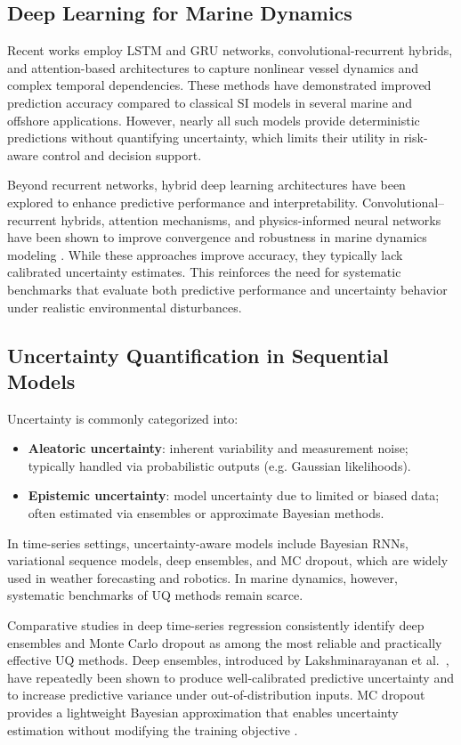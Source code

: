 \documentclass[a4paper,fleqn]{cas-sc}
\begin{document}
\subsection{Deep Learning for Marine Dynamics}

Recent works employ LSTM and GRU networks, convolutional-recurrent hybrids, and attention-based architectures to capture nonlinear vessel dynamics and complex temporal dependencies. These methods have demonstrated improved prediction accuracy compared to classical SI models in several marine and offshore applications. However, nearly all such models provide deterministic predictions without quantifying uncertainty, which limits their utility in risk-aware control and decision support.

Beyond recurrent networks, hybrid deep learning architectures have been explored to enhance predictive performance and interpretability. Convolutional--recurrent hybrids, attention mechanisms, and physics-informed neural networks have been shown to improve convergence and robustness in marine dynamics modeling \cite{gong2025wavelet,baier2021hybrid}. While these approaches improve accuracy, they typically lack calibrated uncertainty estimates. This reinforces the need for systematic benchmarks that evaluate both predictive performance and uncertainty behavior under realistic environmental disturbances.


\subsection{Uncertainty Quantification in Sequential Models}

Uncertainty is commonly categorized into:
\begin{itemize}
    \item \textbf{Aleatoric uncertainty}: inherent variability and measurement noise; typically handled via probabilistic outputs (e.g. Gaussian likelihoods).
    \item \textbf{Epistemic uncertainty}: model uncertainty due to limited or biased data; often estimated via ensembles or approximate Bayesian methods.
\end{itemize}

In time-series settings, uncertainty-aware models include Bayesian RNNs, variational sequence models, deep ensembles, and MC dropout, which are widely used in weather forecasting and robotics. In marine dynamics, however, systematic benchmarks of UQ methods remain scarce.

Comparative studies in deep time-series regression consistently identify deep ensembles and Monte Carlo dropout as among the most reliable and practically effective UQ methods. Deep ensembles, introduced by Lakshminarayanan et al.~\cite{lakshminarayanan2017}, have repeatedly been shown to produce well-calibrated predictive uncertainty and to increase predictive variance under out-of-distribution inputs. MC dropout provides a lightweight Bayesian approximation that enables uncertainty estimation without modifying the training objective \cite{gal2016dropout}. 
\end{document}
